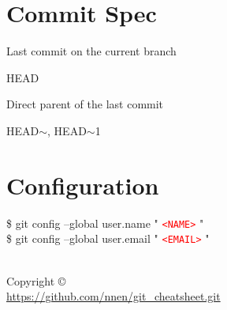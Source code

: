 \documentclass[10pt,a4paper]{article}
\newenvironment{cheatentry}{%
    \noindent%
    \begin{minipage}{\columnwidth}%
    \small%
    \noindent%
}{%
    \end{minipage}%
}
\newenvironment{cheatcmde}{%
    \noindent%
    \begin{cmdbox}%
    \begin{flushleft}%
    \bgroup%
    \setlength{\parindent}{-12pt}%
    \ttfamily\fontseries{b}\selectfont\large%
    \hspace{\parindent}%
}{%
    \egroup%
    \end{flushleft}%
    \end{cmdbox}%
}
\newcommand{\entrysep}{\vspace{1em}}
\newcommand{\cheatcmd}[1]{%
    \begin{cheatcmde}#1\end{cheatcmde}
}
\newcommand{\cheatmetavar}[1]{%
    \textcolor{red}{\texttt{\textless{}#1\textgreater{}}}%
}
\newcommand{\HEADP}[1][]{HEAD$\sim$#1}
\begin{document}
\begin{multicols}{4}
\section*{Commit Spec}

\begin{cheatentry}%
Last commit on the current branch
\cheatcmd{HEAD}
\end{cheatentry}

\entrysep{}%

\begin{cheatentry}%
Direct parent of the last commit
\cheatcmd{\HEADP, \HEADP[1]}
\end{cheatentry}


\section*{Configuration}

\begin{cheatentry}%
\begin{cheatcmde}%
\$ git config --global user.name "\cheatmetavar{NAME}"\\
\$ git config --global user.email "\cheatmetavar{EMAIL}"
\end{cheatcmde}%
\end{cheatentry}


\vfill

\makeatletter
\begin{flushright}\footnotesize
\@title\\
Copyright \copyright{} \@author\\
\url{https://github.com/nnen/git_cheatsheet.git}
\end{flushright}
\makeatother

\end{multicols}
\end{document}
